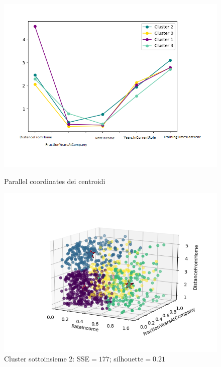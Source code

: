 \documentclass[a4paper,9pt]{article}
\begin{document}
\begin{figure}[H]
\begin{minipage}[b]{0.47\textwidth}
\centering
\includegraphics[width=\textwidth]{par_cor2.png}
\caption{Parallel coordinates dei centroidi}
\label{etichetta1}
\end{minipage}
\hfill
\begin{minipage}[b]{0.55\textwidth}
\includegraphics[scale=0.6]{rate_fraction_distance2.png}
\caption{Cluster sottoinsieme 2: SSE$=177$; silhouette$=0.21$}
\label{etichetta2}
\end{minipage}
\end{figure}
\end{document}
